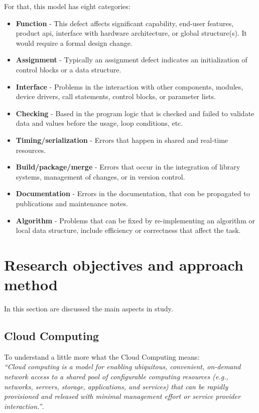 For that, this model has eight categories:

\begin{itemize}
	\item \textbf{Function} - This defect affects significant capability, end-user features, product \acl{api}, interface with hardware architecture, or global structure(s). It would require a formal design change.
	\item \textbf{Assignment} - Typically an assignment defect indicates an initialization of control blocks or a data structure.
	\item \textbf{Interface} - Problems in the interaction with other components, modules, device drivers, call statements, control blocks, or parameter lists.
	\item \textbf{Checking} - Based in the program logic that is checked and failed to validate data and values before the usage, loop conditions, etc.
	\item \textbf{Timing/serialization} - Errors that happen in shared and real-time resources.
	\item \textbf{Build/package/merge} - Errors that occur in the integration of library systems, management of changes, or in version control.
	\item \textbf{Documentation} - Errors in the documentation, that con be propagated to publications and maintenance notes.
	\item \textbf{Algorithm} - Problems that can be fixed by re-implementing an algorithm or local data structure, include efficiency or correctness that affect the task.
\end{itemize}


\newpage
\section{Research objectives and approach method}

In this section are discussed the main aspects in study.

\subsection{Cloud Computing}



To understand a little more what the Cloud Computing means:\\

\textit{``Cloud computing is a model for enabling ubiquitous, convenient, on-demand network access to a shared pool of configurable computing resources (e.g., networks, servers, storage, applications, and services) that can be rapidly provisioned and released with minimal management effort or service provider interaction.''}\cite{mell2011nist}.\\

